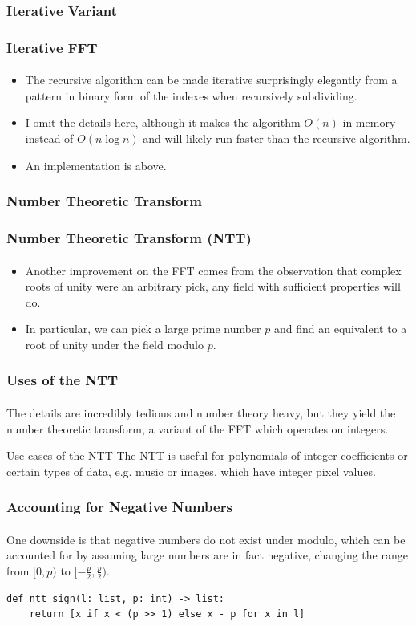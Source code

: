 \documentclass{beamer}                             %
\begin{document}
\subsubsection[Iterative]{Iterative Variant}
\begin{frame}
\frametitle{Iterative FFT}
\framesubtitle{}
\begin{itemize}[<+->]
  \item The recursive algorithm can be made iterative surprisingly elegantly
    from a pattern in binary form of the indexes when recursively subdividing.
  \item I omit the details here, although it makes the
    algorithm \( O(n) \) in memory instead of \( O(n \log n) \)
    and will likely run faster than the recursive algorithm.
  \item An implementation is above.
\end{itemize}
\end{frame}

\subsubsection[NTT]{Number Theoretic Transform}
\begin{frame}
\frametitle{Number Theoretic Transform (NTT)}
\framesubtitle{}
\begin{itemize}
  \item Another improvement on the FFT comes from the observation
    that complex roots of unity were an arbitrary pick, any
    \alert{field} with sufficient properties will do. \pause
  \item In particular, we can pick a large prime number \( p \) and
    find an equivalent to a root of unity under the field modulo \( p \).
\end{itemize}
\end{frame}

\begin{frame}
\frametitle{Uses of the NTT}
\framesubtitle{}
The details are incredibly tedious and number theory heavy, but they yield
the \alert{number theoretic transform}, a variant of the FFT which operates
on integers.
\begin{exampleblock}{Use cases of the NTT}
    The NTT is useful for polynomials of integer coefficients or certain types
    of data, e.g. music or images, which have integer pixel values.
\end{exampleblock}
\end{frame}

\begin{frame}[fragile]
\frametitle{Accounting for Negative Numbers}
\framesubtitle{}
One downside is that negative numbers do not exist under modulo, which can
be accounted for by assuming large numbers are in fact negative,
changing the range from \( [0, p) \) to \( [-\frac{p}{2}, \frac{p}{2}) \).
\begin{verbatim}
def ntt_sign(l: list, p: int) -> list:
    return [x if x < (p >> 1) else x - p for x in l]
\end{verbatim}
\end{frame}
\end{document}
